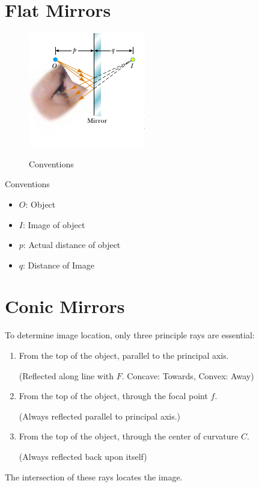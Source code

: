 \documentclass[a4paper,10pt]{report}
\begin{document}
\section{Flat Mirrors}
  \begin{figure}[htpb]
  \begin{centering}
  \begin{center}
  \includegraphics[]{./Images/pqmirror.png}
  \label{fig:parallel_diagram}
  \caption{Conventions}
  \end{center}
  \par\end{centering}
  \end{figure}
  Conventions
  \begin{itemize}
   \item $O$: Object
   \item $I$: Image of object
   \item $p$: Actual distance of object
   \item $q$: Distance of Image
  \end{itemize}

\section{Conic Mirrors}
To determine image location, only three principle rays are essential:
\begin{enumerate}
 \item
    From the top of the object, parallel to the principal axis.

    (Reflected along line with $F$. Concave: Towards, Convex: Away)
 \item
    From the top of the object, through the focal point $f$.

    (Always reflected parallel to principal axis.)
 \item
    From the top of the object, through the center of curvature $C$.

    (Always reflected back upon itself)
\end{enumerate}
The intersection of these rays locates the image.
\end{document}
